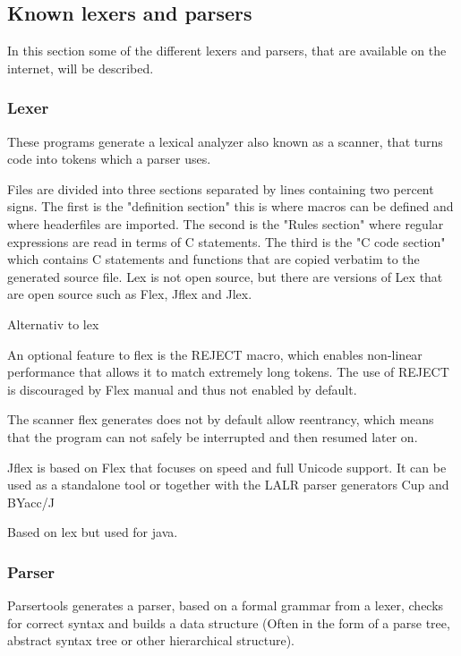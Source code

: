 \subsection{Known lexers and parsers}
\label{sec:KnownLexersAndParsers}

In this section some of the different lexers and parsers, that are available on the internet, will be described.

\subsubsection{Lexer}
These programs generate a lexical analyzer also known as a scanner, that turns code into tokens which a parser uses.

Files are divided into three sections separated by lines containing two percent signs. The first is the "definition section" this is where macros can be defined and where headerfiles are imported. The second is the "Rules section" where regular expressions are read in terms of C statements. The third is the "C code section" which contains C statements and functions that are copied verbatim to the generated source file. Lex is not open source, but there are versions of Lex that are open source such as Flex, Jflex and Jlex. \citep{Lex}

Alternativ to lex \citep{Flex}

An optional feature to flex is the REJECT macro, which enables non-linear performance that allows it to match extremely long tokens. The use of REJECT is discouraged by Flex manual and thus not enabled by default. 

The scanner flex generates does not by default allow reentrancy, which means that the program can not safely be interrupted and then resumed later on.

Jflex is based on Flex that focuses on speed and full Unicode support. It can be used as a standalone tool or together with the LALR parser generators Cup and BYacc/J \citep{Jflex}

Based on lex but used for java. \citep{Jlex}

\subsubsection{Parser}
Parsertools generates a parser, based on a formal grammar from a lexer, checks for correct syntax and builds a data structure (Often in the form of a parse tree, abstract syntax tree or other hierarchical structure). 

